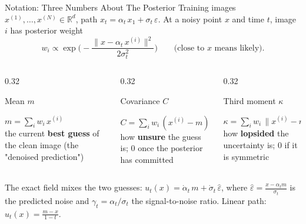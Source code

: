 \documentclass[aspectratio=169]{beamer}
\newcommand{\hl}[1]{\textcolor{coolpurple}{\textbf{#1}}}
\newcommand{\R}{\mathbb{R}}
\newcommand{\xn}[1]{x^{(#1)}}
\newcommand{\eps}{\hat\varepsilon}
\begin{document}
	\begin{frame}{Notation: Three Numbers About The Posterior}
		\small
		Training images $\xn{1}, \dots, \xn{N} \in \R^d$, path $x_t = \alpha_t\,x_1 + \sigma_t\,\varepsilon$. At a noisy point $x$ and time $t$, image $i$ has posterior weight
		$$
			w_i \propto \exp\!\Big(-\frac{\|x - \alpha_t\,\xn{i}\|^2}{2\sigma_t^2}\Big) \qquad \text{(close to $x$ means likely)}.
		$$
		\vspace{-0.6em}
		\begin{columns}[onlytextwidth, T]
			\begin{column}{0.32\textwidth}
				\begin{block}{Mean $m$}
					\footnotesize
					\begin{minipage}[t][1.9cm][t]{\linewidth}
						$m = \sum_i w_i\,\xn{i}$\\[0.3em]
						the current \hl{best guess} of the clean image (the "denoised prediction")
					\end{minipage}
				\end{block}
			\end{column}
			\begin{column}{0.32\textwidth}
				\begin{block}{Covariance $C$}
					\footnotesize
					\begin{minipage}[t][1.9cm][t]{\linewidth}
						$C = \sum_i w_i\,(\xn{i} - m)(\cdot)^\top$\\[0.3em]
						how \hl{unsure} the guess is; $0$ once the posterior has committed
					\end{minipage}
				\end{block}
			\end{column}
			\begin{column}{0.32\textwidth}
				\begin{block}{Third moment $\kappa$}
					\footnotesize
					\begin{minipage}[t][1.9cm][t]{\linewidth}
						$\kappa = \sum_i w_i\,\|\xn{i} - m\|^2(\cdot)$\\[0.3em]
						how \hl{lopsided} the uncertainty is; $0$ if it is symmetric
					\end{minipage}
				\end{block}
			\end{column}
		\end{columns}
		\vspace{0.3em}
		The exact field mixes the two guesses: $u_t(x) = \dot\alpha_t\,m + \dot\sigma_t\,\eps$, where $\eps = \frac{x - \alpha_t m}{\sigma_t}$ is the predicted noise and $\gamma_t = \alpha_t / \sigma_t$ the signal-to-noise ratio. Linear path: $u_t(x) = \frac{m - x}{1 - t}$.
	\end{frame}
\end{document}
